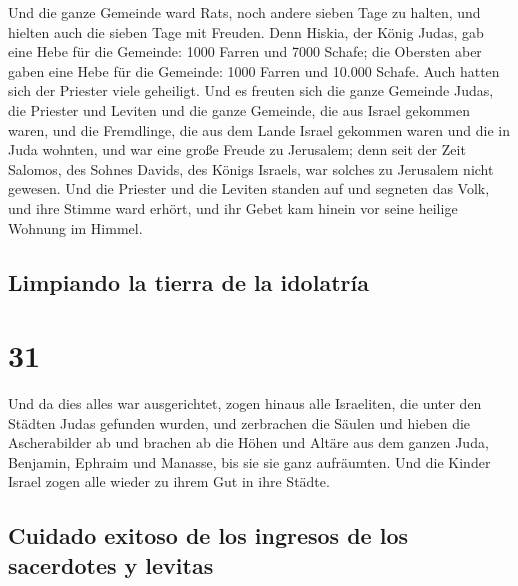  Und die ganze Gemeinde ward Rats, noch andere sieben
Tage zu halten, und hielten auch die sieben Tage mit Freuden.
 Denn Hiskia, der König Judas, gab eine Hebe für die
Gemeinde: 1000 Farren und 7000 Schafe; die Obersten aber gaben eine Hebe
für die Gemeinde: 1000 Farren und 10.000 Schafe. Auch hatten sich der
Priester viele geheiligt.  Und es freuten sich die ganze
Gemeinde Judas, die Priester und Leviten und die ganze Gemeinde, die aus
Israel gekommen waren, und die Fremdlinge, die aus dem Lande Israel
gekommen waren und die in Juda wohnten,  und war eine
große Freude zu Jerusalem; denn seit der Zeit Salomos, des Sohnes
Davids, des Königs Israels, war solches zu Jerusalem nicht gewesen.
 Und die Priester und die Leviten standen auf und
segneten das Volk, und ihre Stimme ward erhört, und ihr Gebet kam hinein
vor seine heilige Wohnung im Himmel.

\hypertarget{limpiando-la-tierra-de-la-idolatruxeda}{%
\subsection{Limpiando la tierra de la
idolatría}\label{limpiando-la-tierra-de-la-idolatruxeda}}

\hypertarget{section-30}{%
\section{31}\label{section-30}}

 Und da dies alles war ausgerichtet, zogen hinaus alle
Israeliten, die unter den Städten Judas gefunden wurden, und zerbrachen
die Säulen und hieben die Ascherabilder ab und brachen ab die Höhen und
Altäre aus dem ganzen Juda, Benjamin, Ephraim und Manasse, bis sie sie
ganz aufräumten. Und die Kinder Israel zogen alle wieder zu ihrem Gut in
ihre Städte.

\hypertarget{cuidado-exitoso-de-los-ingresos-de-los-sacerdotes-y-levitas}{%
\subsection{Cuidado exitoso de los ingresos de los sacerdotes y
levitas}\label{cuidado-exitoso-de-los-ingresos-de-los-sacerdotes-y-levitas}}

